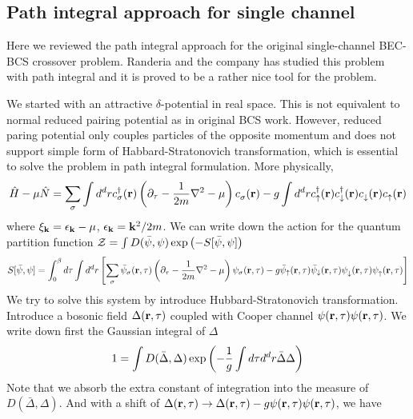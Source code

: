 \subsection{Path integral approach for single channel}
Here we reviewed the path integral approach for the original single-channel BEC-BCS crossover problem. Randeria and the company \cite{RanderiaBEC, Randeria1997, Randeria2008} has studied this problem with path integral and it is proved to be a rather nice tool for the problem.  

We started with an attractive $\delta$-potential in real space.  This is not equivalent to normal reduced pairing potential as in original BCS work.  However, reduced paring potential only couples  particles of the opposite momentum and does not support simple form of Habbard-Stratonovich transformation, which is essential to solve the problem in path integral formulation.   More physically,
\begin{equation}
\hat{H}-\mu\hat{N}=\sum_{\sigma}\int{d^{d}r}c^{\dagger}_{\sigma}(\mathbf{r})\left(\partial_{\tau}-\frac{1}{2m}\nabla^{2}-\mu\right)c^{}_{\sigma}(\mathbf{r})-g\int{d^{d}r}c^{\dagger}_{\uparrow}(\mathbf{r})c^{\dagger}_{\downarrow}(\mathbf{r})c^{}_{\downarrow}(\mathbf{r})c^{}_{\uparrow}(\mathbf{r})
\end{equation}
where $\xi_{\mathbf{k}}=\epsilon_{\mathbf{k}}-\mu$, $\epsilon_{\mathbf{k}}=\mathbf{k}^{2}/2m$.  We can write down the action for the quantum partition function $\mathcal{Z}=\int{D(\bar\psi,\psi)\exp\ensuremath{\left(-S[\bar\psi,\psi]\right)}}$
\begin{equation}
S[\bar\psi,\psi]=\int^{\beta}_{0}d\tau\int{d^{d}r}\left[\sum_{\sigma}\bar\psi_{\sigma}(\mathbf{r},\tau)\left(\partial_{\tau}-\frac{1}{2m}\nabla^{2}-\mu\right)\psi_{\sigma}(\mathbf{r},\tau)-g\bar\psi_{\uparrow}(\mathbf{r},\tau)\bar\psi_{\downarrow}(\mathbf{r},\tau)\psi^{}_{\downarrow}(\mathbf{r},\tau)\psi^{}_{\uparrow}(\mathbf{r},\tau)\right]
\end{equation}
We try to solve this system by introduce Hubbard-Stratonovich transformation.   Introduce a bosonic field $\Delta(\mathbf{r},\tau)$ coupled with Cooper channel $\psi(\mathbf{r},\tau)\psi(\mathbf{r},\tau)$. %
We write down first the Gaussian integral of $\Delta$
\begin{equation}
1=\int{D(\bar\Delta,\Delta)}\exp\left(-\frac{1}{g}\int{d\tau{d}^{d}r}\bar\Delta\Delta\right)
\end{equation}
Note that we absorb the extra constant of integration into the measure of $D(\bar\Delta,\Delta)$.
And with a shift of $\Delta(\mathbf{r},\tau)\rightarrow\Delta(\mathbf{r},\tau)-g\psi(\mathbf{r},\tau)\psi(\mathbf{r},\tau)$, we have 
